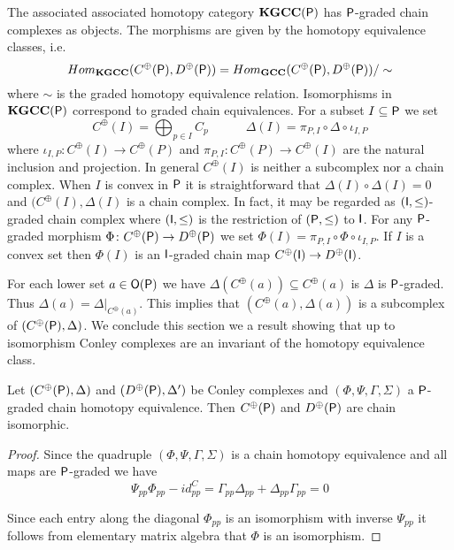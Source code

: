  
 The associated associated homotopy category ${\bf KGCC}({\mathsf P})$ has ${\mathsf P}$-graded chain complexes as objects.  The morphisms are given by the homotopy equivalence classes, i.e. $$Hom_{{\bf KGCC}}(C^\oplus({\mathsf P}), D^\oplus({\mathsf P})) = Hom_{{\bf GCC}}(C^\oplus({\mathsf P}),D^\oplus({\mathsf P}))\slash\sim$$ where $\sim$ is the graded homotopy equivalence relation.  Isomorphisms in ${\bf KGCC}({\mathsf P})$ correspond to graded chain equivalences.  For a subset $I\subseteq {\mathsf P}$ we set 
\[
C^\oplus(I) = \bigoplus_{p\in I} C_p\quad\quad \quad \Delta(I) = \pi_{P,I} \circ \Delta \circ \iota_{I,P}
\]
 where $\iota_{I,P}\colon C^\oplus(I)\to C^\oplus(P)$ and $\pi_{P,I}\colon C^\oplus(P)\to C^\oplus(I)$ are the natural inclusion and projection.  In general $C^\oplus(I)$ is neither a subcomplex nor a chain complex.  When $I$ is convex in ${\mathsf P}$ it is straightforward that $\Delta(I)\circ\Delta(I) = 0$ and $(C^\oplus(I),\Delta(I)$ is a chain complex.  In fact, it may be regarded as $({\mathsf I},\leq)$-graded chain complex where $({\mathsf I},\leq)$ is the restriction of $({\mathsf P},\leq)$ to ${\mathsf I}$.   For any ${\mathsf P}$-graded morphism $\Phi\colon C^\oplus({\mathsf P})\to D^\oplus({\mathsf P})$ we set $\Phi(I) = \pi_{P,I} \circ \Phi \circ \iota_{I,P}$.  If $I$ is a convex set then $\Phi(I)$ is an ${\mathsf I}$-graded chain map $C^\oplus({\mathsf I})\to D^\oplus({\mathsf I})$.  
 
 For each lower set $a\in {\mathsf O}({\mathsf P})$ we have $\Delta(C^\oplus(a))\subseteq C^\oplus(a)$ is $\Delta$ is ${\mathsf P}$-graded.  Thus $\Delta(a)=\Delta|_{C^\oplus(a)} $. This implies that $(C^\oplus(a),\Delta(a))$ is a subcomplex of $(C^\oplus({\mathsf P}),\Delta)$.     We conclude this section we a result showing that up to isomorphism Conley complexes are an invariant of the homotopy equivalence class.
 
 \begin{prop}\label{prop:grad:cmiso}
 Let $(C^\oplus({\mathsf P}),\Delta)$ and $(D^\oplus({\mathsf P}),\Delta')$ be Conley complexes and $(\Phi,\Psi,\Gamma,\Sigma)$ a ${\mathsf P}$-graded chain homotopy equivalence.  Then $C^\oplus({\mathsf P})$ and $D^\oplus({\mathsf P})$ are chain isomorphic.
 \end{prop}
  
  
  \begin{proof}
  Since the quadruple $(\Phi,\Psi,\Gamma,\Sigma)$ is a chain homotopy equivalence and all maps are ${\mathsf P}$-graded we have
 \[
 \Psi_{pp}\Phi_{pp} - id^C_{pp} = \Gamma_{pp}\Delta_{pp}+\Delta_{pp}\Gamma_{pp} = 0
 \]
  
Since each entry along the diagonal $\Phi_{pp}$ is an isomorphism with inverse $\Psi_{pp}$ it follows from elementary matrix algebra that $\Phi$ is an isomorphism.  
  \end{proof}
  
%





